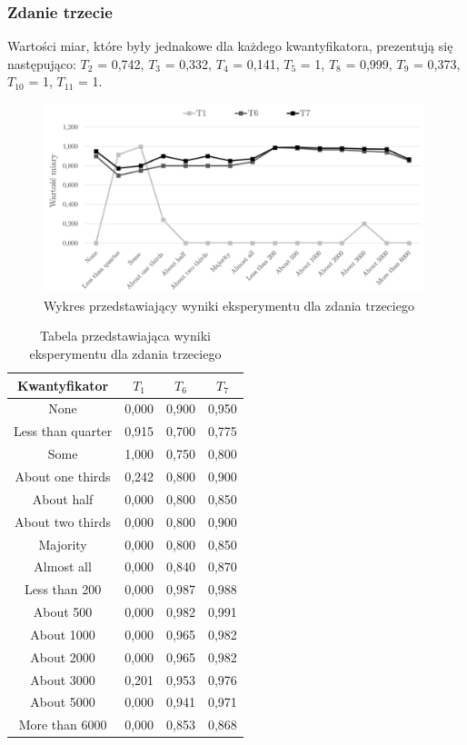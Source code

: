 \documentclass{classrep}
\begin{document}
\clearpage



\subsubsection{Zdanie trzecie}

Wartości miar, które były jednakowe dla każdego kwantyfikatora, prezentują się następująco:
$T_2$ = 0,742, $T_3$ = 0,332, $T_4$ = 0,141, $T_5$ = 1, $T_8$ = 0,999, $T_9$ = 0,373, $T_{10}$ = 1, $T_{11}$ = 1.

\begin{figure}[H]
	\centering
	\includegraphics[width=0.99\textwidth]{Pictures/ResultCharts/Eks1_3.png}
	\caption{Wykres przedstawiający wyniki eksperymentu dla zdania trzeciego}
\end{figure}

\begin{table}[H]
	\centering
	\begin{tabular}{c c c c} 
		\hline
		\textbf{Kwantyfikator}  & \textbf{$T_1$} & \textbf{$T_6$} & \textbf{$T_7$}\\ [0.5ex] 
		\hline
None	&	0,000	&	0,900	&	0,950	\\
Less than quarter	&	0,915	&	0,700	&	0,775	\\
Some 	&	1,000	&	0,750	&	0,800	\\
About one thirds 	&	0,242	&	0,800	&	0,900	\\
About half 	&	0,000	&	0,800	&	0,850	\\
About two thirds 	&	0,000	&	0,800	&	0,900	\\
Majority 	&	0,000	&	0,800	&	0,850	\\
Almost all	&	0,000	&	0,840	&	0,870	\\
Less than 200	&	0,000	&	0,987	&	0,988	\\
About 500	&	0,000	&	0,982	&	0,991	\\
About 1000	&	0,000	&	0,965	&	0,982	\\
About 2000	&	0,000	&	0,965	&	0,982	\\
About 3000	&	0,201	&	0,953	&	0,976	\\
About 5000	&	0,000	&	0,941	&	0,971	\\
More than 6000	&	0,000	&	0,853	&	0,868	\\
		\hline
	\end{tabular}
	\caption{Tabela przedstawiająca wyniki eksperymentu dla zdania trzeciego}
\end{table}
\end{document}
